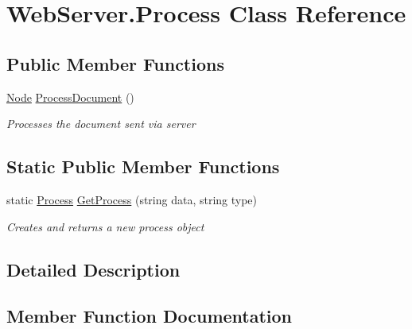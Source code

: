 \hypertarget{class_web_server_1_1_process}{}\section{Web\+Server.\+Process Class Reference}
\label{class_web_server_1_1_process}


 


\subsection*{Public Member Functions}
\begin{DoxyCompactItemize}
\item 
\hyperlink{class_web_server_1_1_node}{Node} \hyperlink{class_web_server_1_1_process_a1e01d70b31479a65280fbfbab855861b}{Process\+Document} ()
\begin{DoxyCompactList}\small\item\em Processes the document sent via server \end{DoxyCompactList}\end{DoxyCompactItemize}
\subsection*{Static Public Member Functions}
\begin{DoxyCompactItemize}
\item 
static \hyperlink{class_web_server_1_1_process}{Process} \hyperlink{class_web_server_1_1_process_a8426008d439d0beef6f59c757a2c22eb}{Get\+Process} (string data, string type)
\begin{DoxyCompactList}\small\item\em Creates and returns a new process object \end{DoxyCompactList}\end{DoxyCompactItemize}


\subsection{Detailed Description}




\subsection{Member Function Documentation}
\mbox{\label{class_web_server_1_1_process_a8426008d439d0beef6f59c757a2c22eb}} 
